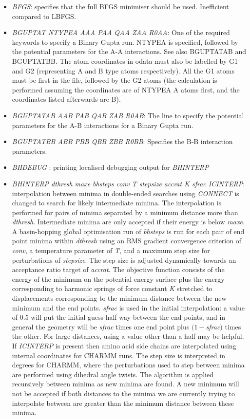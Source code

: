 \documentclass[12pt,a4paper,dvips]{article}
\begin{document}
\begin{itemize}
\item {\it BFGS}: specifies that the full BFGS minimiser should be used. Inefficient compared to LBFGS.

\item {\it BGUPTAT NTYPEA AAA PAA QAA ZAA R0AA}: One of the required keywords to specify a Binary Gupta run.
NTYPEA is specified, followed by the potential parameters for the A-A interactions.  See also BGUPTATAB and BGUPTATBB.
The atom coordinates in odata must also be labelled by G1 and G2 (representing A and B
type atoms respectively).  All the G1 atoms must be first in the file, followed by the G2 atoms (the calculation is performed
assuming the coordinates are of NTYPEA A atoms first, and the coordinates listed afterwards are B).

\item {\it BGUPTATAB AAB PAB QAB ZAB R0AB}: The line to specify the potential parameters for the A-B interactions
for a Binary Gupta run.

\item {\it BGUPTATBB ABB PBB QBB ZBB R0BB}: Specifies the B-B interaction parameters.

\item {\it BHDEBUG\/ }: printing localised debugging output for {\it BHINTERP\/}
 
\item {\it BHINTERP\/ dthresh maxe bhsteps conv T stepsize accrat K sfrac ICINTERP}: interpolation
between minima in double-ended searches using {\it CONNECT\/} is changed to search
for likely intermediate minima. The interpolation is performed for pairs of minima
separated by a minimum distance more than {\it dthresh\/}. 
Intermediate minima are only accepted if their energy is below {\it maxe}.
A basin-hopping global optimisation run of {\it bhsteps} is run for each pair of
end point minima within {\it dthresh\/} using an RMS gradient convergence criterion
of {\it conv\/}, a temperature parameter of {\it T\/}, and a maximum step size for
perturbations of {\it stepsize\/}. The step size is adjusted dynamically towards an
acceptance ratio target of {\it accrat\/}. 
The objective function consists of the energy of the minimum on the potential energy surface
plus the energy corresponding to harmonic springs of force constant {\it K\/}
stretched to displacements corresponding to the minimum distance between the new minimum
and the end points.
{\it sfrac\/} is used in the initial interpolation: a value of 0.5 will put the initial
guess half-way between the end points, and in general the geometry will be {\it sfrac\/} times one 
end point plus $(1-${\it sfrac\/}$)$ times the other. 
For large distances, using a value other than a half may be helpful.
If {\it ICINTERP\/} is present then amino acid side chains are interpolated using
internal coordinates for CHARMM runs.
The step size is interpreted in degrees for CHARMM, where the perturbations used 
to step between minima are performed using dihedral angle twists.
The algorithm is applied recursively between minima as new minima are found.
A new minimum will not be accepted if both distances to the minima we are
currently trying to interpolate between are greater than the minimum distance
between these minima.


\end{itemize}
\end{document}
